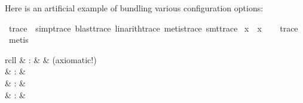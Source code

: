 \begin{isabellebody}
\begin{isamarkuptext}
\begin{description}
  \end{description}

  Here is an artificial example of bundling various configuration
  options:%
\end{isamarkuptext}%
\isamarkuptrue%
\isamarkupfalse%
\ trace\ {}\ {}{}simp{}trace{}\ blast{}trace{}\ linarith{}trace{}\ metis{}trace{}\ smt{}trace{}{}\isanewline
\isanewline
{}\isamarkupfalse%
\ {}x\ {}\ x{}\isanewline
\ \ \isamarkupfalse%
\ trace%
\isadelimproof
\ %
\endisadelimproof
%
\isatagproof
{}\isamarkupfalse%
\ metis%
\endisatagproof
{\isafoldproof}%
%
\isadelimproof
%
\endisadelimproof
%
\isamarkuptrue%
%
\begin{isamarkuptext}%
\begin{matharray}{rcll}
    \hypertarget{command.axiomatization}{\hyperlink{command.axiomatization}{\mbox{}}} & : &  & (axiomatic!) \\
    \hypertarget{command.definition}{\hyperlink{command.definition}{\mbox{}}} & : &  \\
    \hypertarget{attribute.defn}{\hyperlink{attribute.defn}{\mbox{}}} & : &  \\
    \hypertarget{command.abbreviation}{\hyperlink{command.abbreviation}{\mbox{}}} & : &  \\

\end{matharray}
\end{isamarkuptext}
\end{isabellebody}
